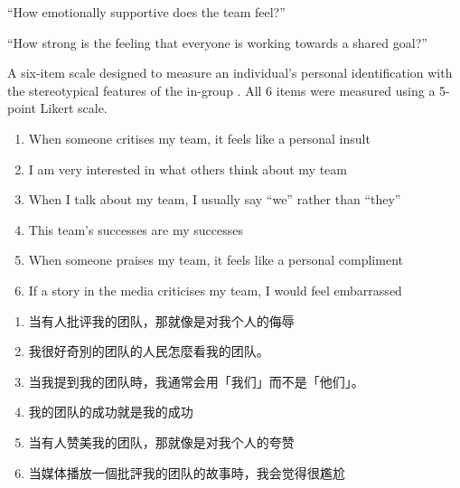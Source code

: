 \begin{CJK}{UTF8}{gbsn}



  \begin{description}[labelindent=1cm]
    \item [Emotional Support] ``How emotionally supportive does the team feel?''
    \item [Shared Goal] ``How strong is the feeling that everyone is working towards a shared goal?''
    \item [Group Identification Verbal] A six-item scale designed to measure an individual's personal identification with the stereotypical features of the in-group  \citep{Mael1992}.  All 6 items were measured using a 5-point Likert scale.
          \begin{enumerate}
            \item When someone critises my team, it feels like a personal insult
            \item I am very interested in what others think about my team
            \item When I talk about my team, I usually say ``we'' rather than ``they''
            \item This team's successes are my successes
            \item When someone praises my team, it feels like a personal compliment
            \item If a story in the media criticises my team, I would feel embarrassed
          \end{enumerate}

          \begin{mccorrection}
            \begin{enumerate}
              \item 当有人批评我的团队，那就像是对我个人的侮辱
              \item 我很好奇別的团队的人民怎麼看我的团队。
              \item 当我提到我的团队時，我通常会用「我们」而不是「他们」。
              \item 我的团队的成功就是我的成功
              \item 当有人赞美我的团队，那就像是对我个人的夸赞
              \item 当媒体播放一個批評我的团队的故事時，我会觉得很尷尬
            \end{enumerate}
          \end{mccorrection}


\end{description}
\end{CJK}
